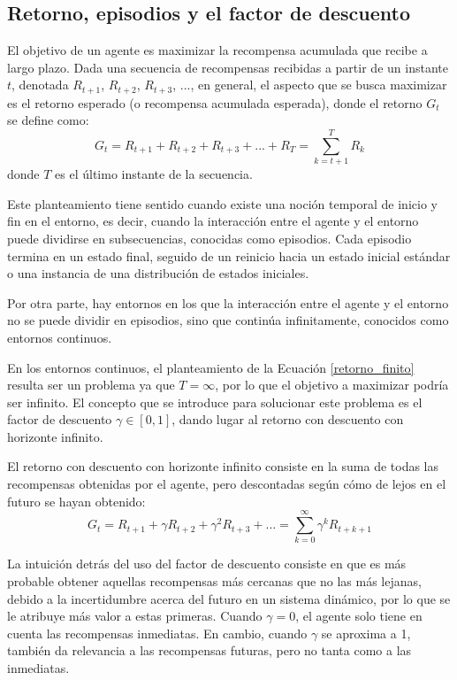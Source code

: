 \subsection{Retorno, episodios y el factor de descuento}

El objetivo de un agente es maximizar la recompensa acumulada que recibe a largo plazo. Dada una secuencia de recompensas recibidas a partir de un instante $t$, denotada $R_{t+1}$, $R_{t+2}$, $R_{t+3}$, ..., en general, el aspecto que se busca maximizar es el retorno esperado (o recompensa acumulada esperada), donde el retorno $G_t$ se define como:
\begin{equation}
\label{retorno_finito}
    G_t = R_{t+1} + R_{t+2} + R_{t+3} + ... + R_{T} = \sum_{k=t+1}^{T} R_{k}
\end{equation}
donde $T$ es el último instante de la secuencia.

Este planteamiento tiene sentido cuando existe una noción temporal de inicio y fin en el entorno, es decir, cuando la interacción entre el agente y el entorno puede dividirse en subsecuencias, conocidas como episodios. Cada episodio termina en un estado final, seguido de un reinicio hacia un estado inicial estándar o una instancia de una distribución de estados iniciales.

Por otra parte, hay entornos en los que la interacción entre el agente y el entorno no se puede dividir en episodios, sino que continúa infinitamente, conocidos como entornos continuos.

En los entornos continuos, el planteamiento de la Ecuación \ref{retorno_finito} resulta ser un problema ya que $T = \infty$, por lo que el objetivo a maximizar podría ser infinito. El concepto que se introduce para solucionar este problema es el factor de descuento $\gamma \in [0, 1]$, dando lugar al retorno con descuento con horizonte infinito.

\newpage

El retorno con descuento con horizonte infinito consiste en la suma de todas las recompensas obtenidas por el agente, pero descontadas según cómo de lejos en el futuro se hayan obtenido:
\begin{equation}
    G_t = R_{t+1} + \gamma R_{t+2} + \gamma^2 R_{t+3} + ... = \sum_{k=0}^{\infty} \gamma^k R_{t+k+1}
    \label{retorno_infinito}
\end{equation}

La intuición detrás del uso del factor de descuento consiste en que es más probable obtener aquellas recompensas más cercanas que no las más lejanas, debido a la incertidumbre acerca del futuro en un sistema dinámico, por lo que se le atribuye más valor a estas primeras. Cuando $\gamma = 0$, el agente solo tiene en cuenta las recompensas inmediatas. En cambio, cuando $\gamma$ se aproxima a 1, también da relevancia a las recompensas futuras, pero no tanta como a las inmediatas.

